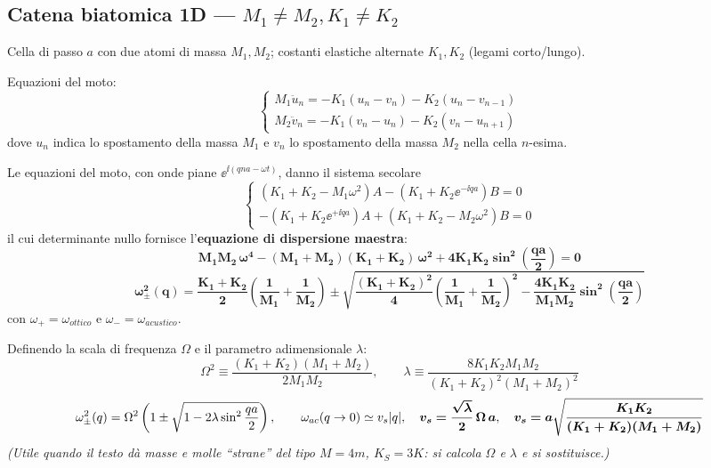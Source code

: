 \subsection{Catena biatomica 1D --- $M_1 \neq M_2, K_1 \neq K_2$}
Cella di passo $a$ con due atomi di massa $M_1, M_2$; costanti elastiche alternate $K_1, K_2$ (legami corto/lungo).

Equazioni del moto: 
\begin{equation*}
    \begin{cases}
M_1 \ddot{u}_n = -K_1(u_n - v_n) - K_2(u_n - v_{n-1}) \\
M_2 \ddot{v}_n = -K_1(v_n - u_n) - K_2(v_n - u_{n+1})
\end{cases} 
\end{equation*}
dove $u_n$ indica lo spostamento della massa $M_1$ e $v_n$ lo spostamento della massa $M_2$ nella cella $n$-esima. 

Le equazioni del moto, con onde piane $\ee^{\ii(qna-\omega t)}$, danno il sistema secolare
\[ \begin{cases} (K_1+K_2 - M_1\omega^2)A - (K_1 + K_2\ee^{-\ii qa})B = 0\\[2pt]
                 -(K_1 + K_2\ee^{+\ii qa})A + (K_1+K_2 - M_2\omega^2)B = 0 \end{cases} \]
il cui determinante nullo fornisce l'\textbf{equazione di dispersione maestra}:
\[ \bm{M_1 M_2\,\omega^4 - (M_1+M_2)(K_1+K_2)\,\omega^2 + 4K_1K_2\sin^2\!\left(\frac{qa}{2}\right) = 0} \]
\[ \bm{\omega^2_{\pm}(q) = \frac{K_1+K_2}{2}\left(\frac{1}{M_1}+\frac{1}{M_2}\right)
   \pm \sqrt{\frac{(K_1+K_2)^2}{4}\left(\frac{1}{M_1}+\frac{1}{M_2}\right)^{\!2} - \frac{4K_1K_2}{M_1M_2}\sin^2\!\left(\frac{qa}{2}\right)}} \]
con $\omega_+ = \omega_{ottico}$ e $\omega_- = \omega_{acustico}$.


Definendo la scala di frequenza $\Omega$ e il parametro adimensionale $\lambda$:
\[ \Omega^2 \equiv \frac{(K_1+K_2)(M_1+M_2)}{2M_1M_2}, \qquad
   \lambda \equiv \frac{8K_1K_2 M_1M_2}{(K_1+K_2)^2(M_1+M_2)^2} \]
\[ \omega^2_\pm(q) = \Omega^2\left(1\pm\sqrt{1-2\lambda\sin^2\frac{qa}{2}}\right),
   \qquad \omega_{ac}(q\to0)\simeq v_s|q|, \quad \bm{v_s = \frac{\sqrt{\lambda}}{2}\,\Omega\,a},  \quad   \bm{v_s = a \sqrt{\frac{K_1 K_2}{(K_1+K_2)(M_1+M_2)}}}  \]
\textit{(Utile quando il testo dà masse e molle ``strane'' del tipo $M=4m$, $K_S=3K$: si calcola $\Omega$ e $\lambda$ e si sostituisce.)}


